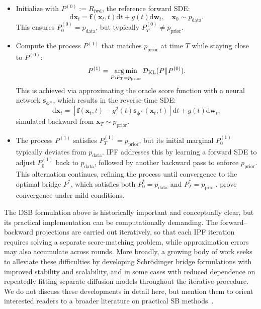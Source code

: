 \begin{itemize}
    \item {} Initialize with $P^{(0)} := R_{\text{fwd}}$, the reference forward SDE:
    \[
        \mathrm{d} \mathbf{x}_t = \mathbf{f}(\mathbf{x}_t, t)   \mathrm{d} t + g(t)   \mathrm{d} \mathbf{w}_t, \quad \mathbf{x}_0 \sim p_{\text{data}}.
    \]
    This ensures $P_0^{(0)} = p_{\text{data}}$, but typically $P_T^{(0)} \neq p_{\text{prior}}$.

    \item {} Compute the process $P^{(1)}$ that matches $p_{\text{prior}}$ at time $T$ while staying close to $P^{(0)}$:
    \[
        P^{(1)} = \operatorname*{arg\,min}_{P : P_T = p_{\text{prior}}} \mathcal{D}_{\text{KL}}(P  \|  P^{(0)}).
    \]
    This is achieved via approximating the oracle score function  with a neural network $\mathbf{s}_{\bm{\phi}^\times}$, which results in the reverse-time SDE:
    \[
        \mathrm{d} \mathbf{x}_t = \left[ \mathbf{f}(\mathbf{x}_t, t) - g^2(t) \mathbf{s}_{\bm{\phi}^\times}(\mathbf{x}_t, t) \right] \mathrm{d} t + g(t)  \mathrm{d} \bar{\mathbf{w}}_t,
    \]
    simulated backward from $\mathbf{x}_T \sim p_{\text{prior}}$.
    
    \item {} The process $P^{(1)}$ satisfies $P_T^{(1)} = p_{\text{prior}}$, but its initial marginal $P_0^{(1)}$ typically deviates from $p_{\text{data}}$. IPF addresses this by learning a forward SDE to adjust $P_0^{(1)}$ back to $p_{\text{data}}$, followed by another backward pass to enforce $p_{\text{prior}}$. This alternation continues, refining the process until convergence to the optimal bridge $P^*$, which satisfies both $P_0^* = p_{\text{data}}$ and $P_T^* = p_{\text{prior}}$. \citet{de2021diffusion} prove convergence under mild conditions.
\end{itemize}


The DSB formulation above is historically important and conceptually clear, but its practical implementation can be computationally demanding. The forward--backward projections are carried out iteratively, so that each IPF iteration requires solving a separate score-matching problem, while approximation errors may also accumulate across rounds. More broadly, a growing body of work seeks to alleviate these difficulties by developing Schr\"odinger bridge formulations with improved stability and scalability, and in some cases with reduced dependence on repeatedly fitting separate diffusion models throughout the iterative procedure. We do not discuss these developments in detail here, but mention them to orient interested readers to a broader literature on practical SB methods~\citep{shi2023dsbm,liu2024gsbm}.




